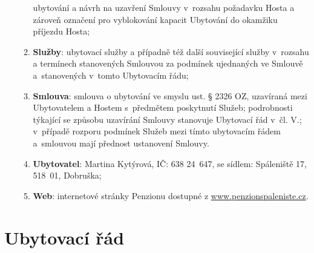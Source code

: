 \documentclass[a4paper]{scrartcl}
\begin{document}
\begin{enumerate}
\begin{enumerate}
                ubytování a návrh na uzavření Smlouvy v~rozsahu požadavku Hosta a
                zároveň označení pro vyblokování kapacit Ubytování do okamžiku
                příjezdu Hosta;
          \item
                \textbf{Služby}: ubytovací služby a případně též další související
                služby v~rozsahu a termínech stanovených Smlouvou za podmínek
                ujednaných ve Smlouvě a~stanovených v~tomto Ubytovacím řádu;
          \item
                \textbf{Smlouva}: smlouva o ubytování ve smyslu ust. § 2326 OZ,
                uzavíraná mezi Ubytovatelem a Hostem s~předmětem poskytnutí
                Služeb; podrobnosti týkající se způsobu uzavírání Smlouvy
                stanovuje Ubytovací řád v~čl. V.; v~případě rozporu podmínek
                Služeb mezi tímto ubytovacím řádem a~smlouvou mají přednost
                ustanovení Smlouvy.
          \item
                \textbf{Ubytovatel}: Martina Kytýrová, IČ: 638 24~647, se sídlem:
                Spáleniště 17, 518~01, Dobruška;
          \item
                \textbf{Web}: internetové stránky Penzionu dostupné z
                \href{http://www.penzionspaleniste.cz/}{www.penzionspaleniste.cz}.
        \end{enumerate}
\end{enumerate}

\section{Ubytovací řád}
\end{document}
